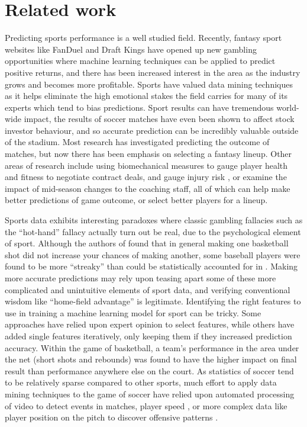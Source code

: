 \documentclass[conference]{IEEEtran}
\begin{document}
\section{Related work}
Predicting sports performance is a well studied field. Recently, fantasy sport websites like FanDuel and Draft Kings have opened up new gambling opportunities where machine learning techniques can be applied to predict positive returns\cite{Sugar:aa}, and there has been increased interest in the area\cite{Bishop:2004aa} as the industry grows and becomes more profitable. Sports have valued data mining techniques as it helps eliminate the high emotional stakes the field carries for many of its experts which tend to bias predictions\cite{Haghighat:2013aa}. Sport results can have tremendous world-wide impact, the results of soccer matches have even been shown to affect stock investor behaviour\cite{Edmans:2007aa}, and so accurate prediction can be incredibly valuable outside of the stadium. Most research has investigated predicting the outcome of matches, but now there has been emphasis on selecting a fantasy lineup. Other areas of research include using biomechanical measures to gauge player health and fitness to negotiate contract deals\cite{Davenport:2010aa}, and gauge injury risk \cite{Carling:2012aa,Owen:2015aa}, or examine the impact of mid-season changes to the coaching staff\cite{coach}, all of which can help make better predictions of game outcome, or select better players for a lineup.

Sports data exhibits interesting paradoxes where classic gambling fallacies such as the ``hot-hand'' fallacy actually turn out be real, due to the psychological element of sport. Although the authors of \cite{Gilovich:1985aa} found that in general making one basketball shot did not increase your chances of making another, some baseball players were found to be more ``streaky'' than could be statistically accounted for in \cite{Albert:2008aa}. Making more accurate predictions may rely upon teasing apart some of these more complicated and unintuitive elements of sport data, and verifying conventional wisdom like ``home-field advantage'' is legitimate\cite{textbook}. Identifying the right features to use in training a machine learning model for sport can be tricky. Some approaches have relied upon expert opinion to select features\cite{Zdravevski:2010aa}, while others have added single features iteratively, only keeping them if they increased prediction accuracy\cite{Buursma:2011aa}. Within the game of basketball, a team's performance in the area under the net (short shots and rebounds) was found to have the higher impact on final result than performance anywhere else on the court\cite{Ivankovic:2010aa}. As statistics of soccer tend to be relatively sparse compared to other sports, much effort to apply data mining techniques to the game of soccer have relied upon automated processing of video to detect events in matches\cite{Sykora2015,goal_detection}, player speed \cite{Redwood-Brown:2012aa}, or more complex data like player position on the pitch to discover offensive patterns \cite{offence_patterns}. 
\end{document}
